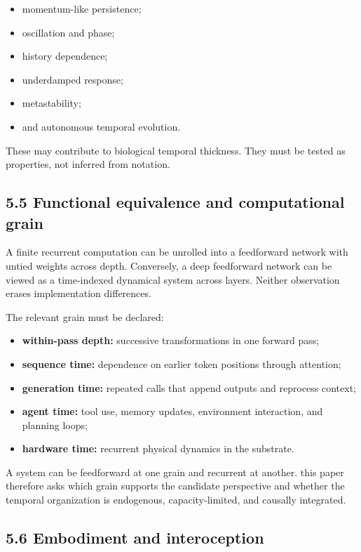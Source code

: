 \documentclass[
  11pt,
]{article}
\providecommand{\tightlist}{%
  \setlength{\itemsep}{0pt}\setlength{\parskip}{0pt}}
\begin{document}
\begin{itemize}
\tightlist
\item
  momentum-like persistence;
\item
  oscillation and phase;
\item
  history dependence;
\item
  underdamped response;
\item
  metastability;
\item
  and autonomous temporal evolution.
\end{itemize}

These may contribute to biological temporal thickness. They must be
tested as properties, not inferred from notation.

\subsection{5.5 Functional equivalence and computational
grain}\label{functional-equivalence-and-computational-grain}

A finite recurrent computation can be unrolled into a feedforward
network with untied weights across depth. Conversely, a deep feedforward
network can be viewed as a time-indexed dynamical system across layers.
Neither observation erases implementation differences.

The relevant grain must be declared:

\begin{itemize}
\tightlist
\item
  \textbf{within-pass depth:} successive transformations in one forward
  pass;
\item
  \textbf{sequence time:} dependence on earlier token positions through
  attention;
\item
  \textbf{generation time:} repeated calls that append outputs and
  reprocess context;
\item
  \textbf{agent time:} tool use, memory updates, environment
  interaction, and planning loops;
\item
  \textbf{hardware time:} recurrent physical dynamics in the substrate.
\end{itemize}

A system can be feedforward at one grain and recurrent at another. this
paper therefore asks which grain supports the candidate perspective and
whether the temporal organization is endogenous, capacity-limited, and
causally integrated.

\subsection{5.6 Embodiment and
interoception}\label{embodiment-and-interoception}
\end{document}
